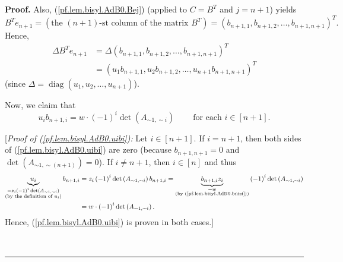 \documentclass[numbers=enddot,12pt,final,onecolumn,notitlepage]{scrartcl}%
\theoremstyle{definition}
\newenvironment{proof}[1][Proof]{\noindent\textbf{#1.} }{\ \rule{0.5em}{0.5em}}
\newenvironment{vershort}{}{}
\begin{document}
\begin{proof}
Also, (\ref{pf.lem.bisyl.AdB0.Bej}) (applied to $C=B^{T}$ and $j=n+1$) yields%
\[
B^{T}e_{n+1}=\left(  \text{the }\left(  n+1\right)  \text{-st column of the
matrix }B^{T}\right)  =\left(  b_{n+1,1},b_{n+1,2},\ldots,b_{n+1,n+1}\right)
^{T}.
\]
Hence,%
\begin{align}
\Delta B^{T}e_{n+1}  &  =\Delta\left(  b_{n+1,1},b_{n+1,2},\ldots
,b_{n+1,n+1}\right)  ^{T}\nonumber\\
&  =\left(  u_{1}b_{n+1,1},u_{2}b_{n+1,2},\ldots,u_{n+1}b_{n+1,n+1}\right)
^{T} \label{pf.lem.bisyl.AdB0.DelBTe}%
\end{align}
(since $\Delta=\operatorname*{diag}\left(  u_{1},u_{2},\ldots,u_{n+1}\right)
$).

Now, we claim that%
\begin{equation}
u_{i}b_{n+1,i}=w\cdot\left(  -1\right)  ^{i}\det\left(  A_{\sim1,\sim
i}\right)  \ \ \ \ \ \ \ \ \ \ \text{for each }i\in\left[  n+1\right]  .
\label{pf.lem.bisyl.AdB0.uibi}%
\end{equation}


\begin{vershort}
[\textit{Proof of (\ref{pf.lem.bisyl.AdB0.uibi}):} Let $i\in\left[
n+1\right]  $. If $i=n+1$, then both sides of (\ref{pf.lem.bisyl.AdB0.uibi})
are zero (because $b_{n+1,n+1}=0$ and $\det\left(  A_{\sim1,\sim\left(
n+1\right)  }\right)  =0$). If $i\neq n+1$, then $i\in\left[  n\right]  $ and
thus%
\begin{align*}
\underbrace{u_{i}}_{\substack{=z_{i}\left(  -1\right)  ^{i}\det\left(
A_{\sim1,\sim i}\right)  \\\text{(by the definition of }u_{i}\text{)}%
}}b_{n+1,i}  &  =z_{i}\left(  -1\right)  ^{i}\det\left(  A_{\sim1,\sim
i}\right)  b_{n+1,i}=\underbrace{b_{n+1,i}z_{i}}_{\substack{=w\\\text{(by
(\ref{pf.lem.bisyl.AdB0.bnizi}))}}}\left(  -1\right)  ^{i}\det\left(
A_{\sim1,\sim i}\right) \\
&  =w\cdot\left(  -1\right)  ^{i}\det\left(  A_{\sim1,\sim i}\right)  .
\end{align*}
Hence, (\ref{pf.lem.bisyl.AdB0.uibi}) is proven in both cases.]
\end{vershort}


\end{proof}
\end{document}
